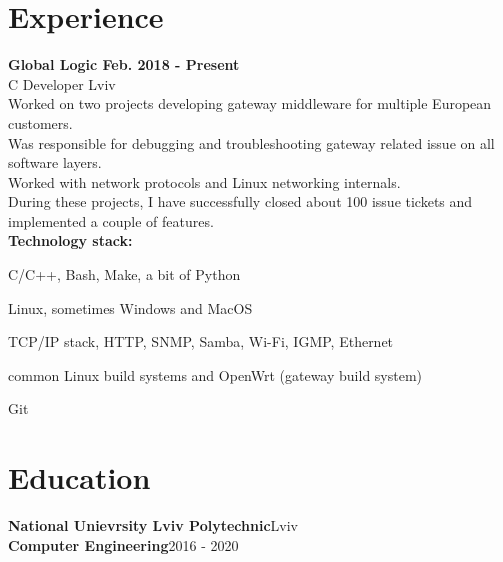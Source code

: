 \documentclass{article}
\begin{document}
\section{Experience}
{\bfseries
Global Logic \hspace*{\fill}Feb. 2018 - Present\\
}
\vspace{0.5em}
C Developer  \hspace*{\fill}Lviv\\
Worked on two projects developing gateway middleware for multiple European customers.\\
Was responsible for debugging and troubleshooting gateway related issue on all software layers.\\
Worked with network protocols and Linux networking internals.\\
During these projects, I have successfully closed about 100 issue tickets and implemented a couple of features.\\

\textbf{Technology stack:}
\begin{description}[align=left,leftmargin=3.8cm,style=multiline,font=\normalfont]
\item[Languages:] C/C++, Bash, Make, a bit of Python
\item[Operating Systems:] Linux, sometimes Windows and MacOS
\item[Networking:] TCP/IP stack, HTTP, SNMP, Samba, Wi-Fi, IGMP, Ethernet
\item[Build systems:] common Linux build systems and OpenWrt (gateway build system)
\item[VCS:] Git\\
\end{description}

\section{Education}
\textbf{National Unievrsity Lviv Polytechnic}\hspace*{\fill}Lviv\\
\textbf{Computer Engineering}\hspace*{\fill}2016 - 2020
\end{document}

